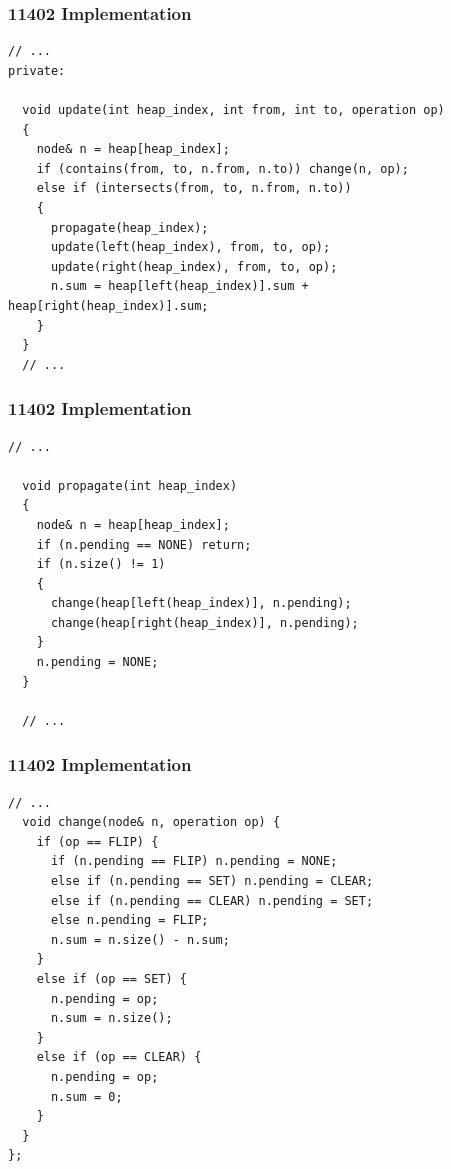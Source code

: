 \documentclass{beamer}
\begin{document}
\begin{frame}[containsverbatim]
\frametitle{11402 Implementation}

\scriptsize

\begin{lstlisting}[mathescape]
  // ...
private:

  void update(int heap_index, int from, int to, operation op)
  {
    node& n = heap[heap_index];
    if (contains(from, to, n.from, n.to)) change(n, op);
    else if (intersects(from, to, n.from, n.to))
    {
      propagate(heap_index);
      update(left(heap_index), from, to, op);
      update(right(heap_index), from, to, op);
      n.sum = heap[left(heap_index)].sum + heap[right(heap_index)].sum;
    }
  }
  // ...
\end{lstlisting}

\end{frame}

\begin{frame}[containsverbatim]
\frametitle{11402 Implementation}

\scriptsize

\begin{lstlisting}[mathescape]
  // ...

  void propagate(int heap_index)
  {
    node& n = heap[heap_index];
    if (n.pending == NONE) return;
    if (n.size() != 1)
    {
      change(heap[left(heap_index)], n.pending);
      change(heap[right(heap_index)], n.pending);
    }
    n.pending = NONE;
  }

  // ...
\end{lstlisting}

\end{frame}

\begin{frame}[containsverbatim]
\frametitle{11402 Implementation}

\scriptsize

\begin{lstlisting}[mathescape]
  // ...
  void change(node& n, operation op) {
    if (op == FLIP) {
      if (n.pending == FLIP) n.pending = NONE;
      else if (n.pending == SET) n.pending = CLEAR;
      else if (n.pending == CLEAR) n.pending = SET;
      else n.pending = FLIP;
      n.sum = n.size() - n.sum;
    }
    else if (op == SET) {
      n.pending = op;
      n.sum = n.size();
    }
    else if (op == CLEAR) {
      n.pending = op;
      n.sum = 0;
    }
  }
};
\end{lstlisting}

\end{frame}
\end{document}

